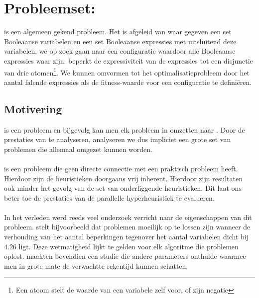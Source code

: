 \section{Probleemset: }

 is een algemeen gekend probleem. Het is afgeleid van  waar gegeven een set Booleaanse variabelen en een set Booleaanse expressies met uitsluitend deze variabelen, we op zoek gaan naar een configuratie waardoor alle Booleaanse expressies waar zijn.  beperkt de expressiviteit van de expressies tot een disjunctie van drie atomen\footnote{Een atoom stelt de waarde van een variabele zelf voor, of zijn negatie}. We kunnen  omvormen tot het optimalisatieprobleem  door het aantal falende expressies als de fitness-waarde voor een configuratie te defini\"eren.

\subsection{Motivering}

 is een  probleem en bijgevolg kan men elk probleem in  omzetten naar . Door de prestaties van  te analyseren, analyseren we dus impliciet een grote set van problemen die allemaal omgezet kunnen worden.

\paragraph{}
 is een probleem die geen directe connectie met een praktisch probleem heeft. Hierdoor zijn de heuristieken doorgaans vrij inherent. Hierdoor zijn resultaten ook minder het gevolg van de set van onderliggende heuristieken. Dit laat ons beter toe de prestaties van de parallelle hyperheuristiek te evalueren.

\paragraph{}
In het verleden werd reeds veel onderzoek verricht naar de eigenschappen van dit probleem. \cite{Selman96generatinghard} stelt bijvoorbeeld dat  problemen moeilijk op te lossen zijn wanneer de verhouding van het aantal beperkingen tegenover het aantal variabelen dicht bij $4.26$ ligt. Deze wetmatigheid lijkt te gelden voor elk algoritme die  problemen oplost. \cite{Nudelman_understandingrandom} maakten bovendien een studie die andere parameters onthulde waarmee men in grote mate de verwachtte rekentijd kunnen schatten.

